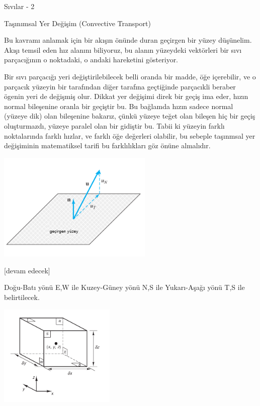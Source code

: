 \documentclass[12pt,fleqn]{article}\usepackage{../../common}
\begin{document}
Sıvılar - 2

Taşınımsal Yer Değişim (Convective Transport)

Bu kavramı anlamak için bir akışın önünde duran geçirgen bir yüzey
düşünelim. Akışı temsil eden hız alanını biliyoruz, bu alanın yüzeydeki
vektörleri bir sıvı parçacığının o noktadaki, o andaki hareketini gösteriyor.

Bir sıvı parçacığı yeri değiştirilebilecek belli oranda bir madde, öğe
içerebilir, ve o parçacık yüzeyin bir tarafından diğer tarafına geçtiğinde
parçacıkli beraber ögenin yeri de değişmiş olur. Dikkat yer değişimi direk bir
geçiş ima eder, hızın normal bileşenine oranla bir geçiştir bu. Bu bağlamda
hızın sadece normal (yüzeye dik) olan bileşenine bakarız, çünkü yüzeye
teğet olan bileşen hiç bir geçiş oluşturmazdı, yüzeye paralel olan bir
gidiştir bu. Tabii ki yüzeyin farklı noktalarında farklı hızlar, ve farklı
öğe değerleri olabilir, bu sebeple taşınmsal yer değişiminin matematiksel
tarifi bu farklılıkları göz önüne almalıdır. 

\includegraphics[width=20em]{phy_030_fluid2_04.png}










[devam edecek]


Doğu-Batı yönü E,W ile Kuzey-Güney yönü N,S ile Yukarı-Aşağı yönü T,S
ile belirtilecek. 

\includegraphics[width=15em]{phy_030_fluid2_03.png}
\end{document}
